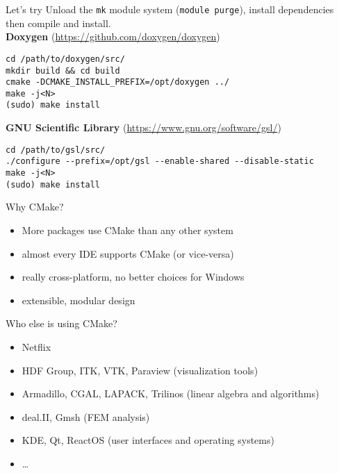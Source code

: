 \documentclass[aspectratio=169,11pt]{beamer}
\begin{document}
\begin{frame}[fragile]{Let's try}
Unload the \texttt{mk} module system (\texttt{module purge}), install dependencies then compile and install.\\
\textbf{Doxygen} {\small (\url{https://github.com/doxygen/doxygen})}
\begin{verbatim}
cd /path/to/doxygen/src/
mkdir build && cd build
cmake -DCMAKE_INSTALL_PREFIX=/opt/doxygen ../
make -j<N>
(sudo) make install
\end{verbatim}
\textbf{GNU Scientific Library} {\small (\url{https://www.gnu.org/software/gsl/})}
\begin{verbatim}
cd /path/to/gsl/src/
./configure --prefix=/opt/gsl --enable-shared --disable-static
make -j<N>
(sudo) make install
\end{verbatim}
\end{frame}

\begin{frame}{Why CMake?}
\begin{itemize}
    \item More packages use CMake than any other system
    \item almost every IDE supports CMake (or vice-versa)
    \item really cross-platform, no better choices for Windows
    \item extensible, modular design
\end{itemize}
\vfill
\pause
Who else is using CMake?
\begin{itemize}
    \item Netflix
    \item HDF Group, ITK, VTK, Paraview (visualization tools)
    \item Armadillo, CGAL, LAPACK, Trilinos (linear algebra and algorithms)
    \item deal.II, Gmsh (FEM analysis)
    \item KDE, Qt, ReactOS (user interfaces and operating systems)
    \item \dots
\end{itemize}
\end{frame}
\end{document}
